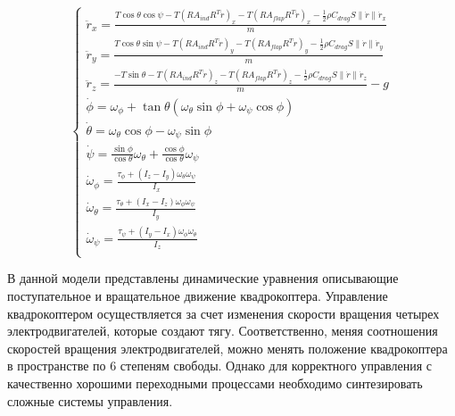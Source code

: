 \begin{equation}
\begin{cases}
    \ddot{r}_x = \frac{T \cos\theta \cos\psi - T (R A_{ind} R^T \dot{r})_x - T (R A_{flap} R^T \dot{r})_x - \frac{1}{2} \rho C_{drag} S \|\dot{r}\| \dot{r}_x}{m} \\
    \ddot{r}_y = \frac{T \cos\theta \sin\psi - T (R A_{ind} R^T \dot{r})_y - T (R A_{flap} R^T \dot{r})_y - \frac{1}{2} \rho C_{drag} S \|\dot{r}\| \dot{r}_y}{m} \\
    \ddot{r}_z = \frac{-T \sin\theta - T (R A_{ind} R^T \dot{r})_z - T (R A_{flap} R^T \dot{r})_z - \frac{1}{2} \rho C_{drag} S \|\dot{r}\| \dot{r}_z}{m} - g \\
    \dot{\phi} = \omega_{\phi} + \tan\theta (\omega_{\theta} \sin\phi + \omega_{\psi} \cos\phi) \\
    \dot{\theta} = \omega_{\theta} \cos\phi - \omega_{\psi} \sin\phi \\
    \dot{\psi} = \frac{\sin\phi}{\cos\theta} \omega_{\theta} + \frac{\cos\phi}{\cos\theta} \omega_{\psi} \\
    \dot{\omega}_{\phi} = \frac{\tau_{\phi}+(I_z-I_y) \omega_{\theta} \omega_{\psi}}{I_{x}} \\
    \dot{\omega}_{\theta} = \frac{\tau_{\theta}+(I_x-I_z) \omega_{\phi} \omega_{\psi}}{I_{y}} \\
    \dot{\omega}_{\psi} = \frac{\tau_{\psi}+(I_y-I_x) \omega_{\phi} \omega_{\theta}}{I_{z}} \\
\end{cases}
\label{eq:system}
\end{equation}

В данной модели представлены динамические уравнения описывающие поступательное и вращательное 
движение квадрокоптера. Управление квадрокоптером осуществляется за счет изменения скорости 
вращения четырех электродвигателей, которые создают тягу. Соответственно, меняя соотношения скоростей
вращения электродвигателей, можно менять положение квадрокоптера в пространстве по 6 степеням свободы. Однако
для корректного управления с качественно хорошими переходными процессами необходимо синтезировать 
сложные системы управления.

\endinput